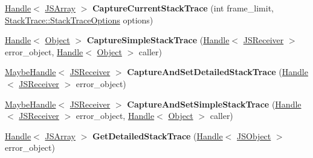 \begin{DoxyCompactItemize}
\item 
\hyperlink{classv8_1_1internal_1_1_handle}{Handle}$<$ \hyperlink{classv8_1_1internal_1_1_j_s_array}{J\+S\+Array} $>$ {\bfseries Capture\+Current\+Stack\+Trace} (int frame\+\_\+limit, \hyperlink{classv8_1_1_stack_trace_a9704e4a37949eb8eb8ccddbddf161492}{Stack\+Trace\+::\+Stack\+Trace\+Options} options)\hypertarget{classv8_1_1internal_1_1_isolate_abb32dfbd23281a600e08a714c1b6e873}{}\label{classv8_1_1internal_1_1_isolate_abb32dfbd23281a600e08a714c1b6e873}

\item 
\hyperlink{classv8_1_1internal_1_1_handle}{Handle}$<$ \hyperlink{classv8_1_1internal_1_1_object}{Object} $>$ {\bfseries Capture\+Simple\+Stack\+Trace} (\hyperlink{classv8_1_1internal_1_1_handle}{Handle}$<$ \hyperlink{classv8_1_1internal_1_1_j_s_receiver}{J\+S\+Receiver} $>$ error\+\_\+object, \hyperlink{classv8_1_1internal_1_1_handle}{Handle}$<$ \hyperlink{classv8_1_1internal_1_1_object}{Object} $>$ caller)\hypertarget{classv8_1_1internal_1_1_isolate_ad9e62869d6a683999532d78c222824ba}{}\label{classv8_1_1internal_1_1_isolate_ad9e62869d6a683999532d78c222824ba}

\item 
\hyperlink{classv8_1_1internal_1_1_maybe_handle}{Maybe\+Handle}$<$ \hyperlink{classv8_1_1internal_1_1_j_s_receiver}{J\+S\+Receiver} $>$ {\bfseries Capture\+And\+Set\+Detailed\+Stack\+Trace} (\hyperlink{classv8_1_1internal_1_1_handle}{Handle}$<$ \hyperlink{classv8_1_1internal_1_1_j_s_receiver}{J\+S\+Receiver} $>$ error\+\_\+object)\hypertarget{classv8_1_1internal_1_1_isolate_a2c68a9eb9a1741a67f8cda3e40f781e5}{}\label{classv8_1_1internal_1_1_isolate_a2c68a9eb9a1741a67f8cda3e40f781e5}

\item 
\hyperlink{classv8_1_1internal_1_1_maybe_handle}{Maybe\+Handle}$<$ \hyperlink{classv8_1_1internal_1_1_j_s_receiver}{J\+S\+Receiver} $>$ {\bfseries Capture\+And\+Set\+Simple\+Stack\+Trace} (\hyperlink{classv8_1_1internal_1_1_handle}{Handle}$<$ \hyperlink{classv8_1_1internal_1_1_j_s_receiver}{J\+S\+Receiver} $>$ error\+\_\+object, \hyperlink{classv8_1_1internal_1_1_handle}{Handle}$<$ \hyperlink{classv8_1_1internal_1_1_object}{Object} $>$ caller)\hypertarget{classv8_1_1internal_1_1_isolate_aefa4875593777790af81875f40a0cdc0}{}\label{classv8_1_1internal_1_1_isolate_aefa4875593777790af81875f40a0cdc0}

\item 
\hyperlink{classv8_1_1internal_1_1_handle}{Handle}$<$ \hyperlink{classv8_1_1internal_1_1_j_s_array}{J\+S\+Array} $>$ {\bfseries Get\+Detailed\+Stack\+Trace} (\hyperlink{classv8_1_1internal_1_1_handle}{Handle}$<$ \hyperlink{classv8_1_1internal_1_1_j_s_object}{J\+S\+Object} $>$ error\+\_\+object)\hypertarget{classv8_1_1internal_1_1_isolate_a23f7cf9f2ee97abbf085775cb777176e}{}\label{classv8_1_1internal_1_1_isolate_a23f7cf9f2ee97abbf085775cb777176e}


\end{DoxyCompactItemize}
